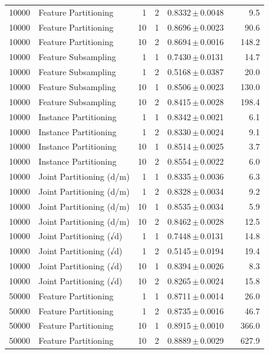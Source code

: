 \begin{table}[ht]
\begin{tabular}{rlrrccr}
10000 & Feature Partitioning & 1 & 2 & 0.8332\,$\pm$\,0.0048 &  & 9.5 \\
10000 & Feature Partitioning & 10 & 1 & 0.8696\,$\pm$\,0.0023 &  & 90.6 \\
10000 & Feature Partitioning & 10 & 2 & 0.8694\,$\pm$\,0.0016 &  & 148.2 \\
10000 & Feature Subsampling & 1 & 1 & 0.7430\,$\pm$\,0.0131 &  & 14.7 \\
10000 & Feature Subsampling & 1 & 2 & 0.5168\,$\pm$\,0.0387 &  & 20.0 \\
10000 & Feature Subsampling & 10 & 1 & 0.8506\,$\pm$\,0.0023 &  & 130.0 \\
10000 & Feature Subsampling & 10 & 2 & 0.8415\,$\pm$\,0.0028 &  & 198.4 \\
10000 & Instance Partitioning & 1 & 1 & 0.8342\,$\pm$\,0.0021 &  & 6.1 \\
10000 & Instance Partitioning & 1 & 2 & 0.8330\,$\pm$\,0.0024 &  & 9.1 \\
10000 & Instance Partitioning & 10 & 1 & 0.8514\,$\pm$\,0.0025 &  & 3.7 \\
10000 & Instance Partitioning & 10 & 2 & 0.8554\,$\pm$\,0.0022 &  & 6.0 \\
10000 & Joint Partitioning (d/m) & 1 & 1 & 0.8335\,$\pm$\,0.0036 &  & 6.3 \\
10000 & Joint Partitioning (d/m) & 1 & 2 & 0.8328\,$\pm$\,0.0034 &  & 9.2 \\
10000 & Joint Partitioning (d/m) & 10 & 1 & 0.8535\,$\pm$\,0.0034 &  & 5.9 \\
10000 & Joint Partitioning (d/m) & 10 & 2 & 0.8462\,$\pm$\,0.0028 &  & 12.5 \\
10000 & Joint Partitioning (√d) & 1 & 1 & 0.7448\,$\pm$\,0.0131 &  & 14.8 \\
10000 & Joint Partitioning (√d) & 1 & 2 & 0.5145\,$\pm$\,0.0194 &  & 19.4 \\
10000 & Joint Partitioning (√d) & 10 & 1 & 0.8394\,$\pm$\,0.0026 &  & 8.3 \\
10000 & Joint Partitioning (√d) & 10 & 2 & 0.8265\,$\pm$\,0.0024 &  & 15.8 \\
50000 & Feature Partitioning & 1 & 1 & 0.8711\,$\pm$\,0.0014 &  & 26.0 \\
50000 & Feature Partitioning & 1 & 2 & 0.8735\,$\pm$\,0.0016 &  & 46.7 \\
50000 & Feature Partitioning & 10 & 1 & 0.8915\,$\pm$\,0.0010 &  & 366.0 \\
50000 & Feature Partitioning & 10 & 2 & 0.8889\,$\pm$\,0.0029 &  & 627.9 \\

\end{tabular}
\end{table}
